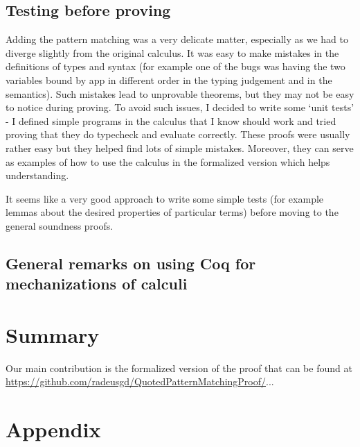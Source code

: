 \documentclass[runningheads]{article}
\begin{document}
\subsection{Testing before proving}
Adding the pattern matching was a very delicate matter, especially as we had to diverge slightly from the original calculus. It was easy to make mistakes in the definitions of types and syntax (for example one of the bugs was having the two variables bound by app in different order in the typing judgement and in the semantics). Such mistakes lead to unprovable theorems, but they may not be easy to notice during proving. To avoid such issues, I decided to write some `unit tests' - I defined simple programs in the calculus that I know should work and tried proving that they do typecheck and evaluate correctly. These proofs were usually rather easy but they helped find lots of simple mistakes. Moreover, they can serve as examples of how to use the calculus in the formalized version which helps understanding.

It seems like a very good approach to write some simple tests (for example lemmas about the desired properties of particular terms) before moving to the general soundness proofs.

\subsection{General remarks on using Coq for mechanizations of calculi}




\section{Summary}

Our main contribution is the formalized version of the proof that can be found at \\ \href{https://github.com/radeusgd/QuotedPatternMatchingProof/}{https://github.com/radeusgd/QuotedPatternMatchingProof/}...







\section*{Appendix}

\end{document}
